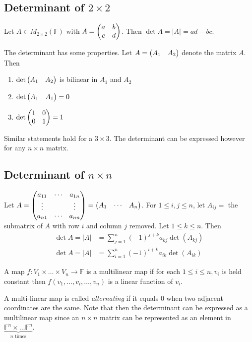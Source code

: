 \documentclass[../notes.tex]{subfiles}
\begin{document}

\subsection{Determinant of $2 \times 2$}

\begin{definition}
    Let $A \in M_{2\times 2}(\mathbb{F})$ with $A = \mqty(a & b \\ c & d)$. Then $\det A = |A| = ad - bc$.
    \begin{remark}
        The determinant has some properties. Let $A = \mqty(A_1 & A_2)$ denote the matrix $A$. Then
        \begin{enumerate}
            \item $\det\mqty(A_1 & A_2)$ is bilinear in $A_1$ and $A_2$
            \item $\det\mqty(A_1 & A_1) = 0$
            \item $\det\mqty(1 & 0 \\ 0 & 1) = 1$
        \end{enumerate}
    \end{remark}
\end{definition}

Similar statements hold for a $3\times 3$. The determinant can be expressed however for any $n \times n$ matrix.

\subsection{Determinant of $n \times n$}

\begin{definition}[Determinant]
    Let $A = \mqty(a_{11} & \cdots & a_{1n} \\ \vdots & & \vdots \\ a_{n1} & \cdots & a_{nn}) = \mqty(A_1 & \cdots & A_n)$. For $1 \leq i,j \leq n$, let $A_{ij} = $ the submatrix of $A$ with row $i$ and column $j$ removed. Let $1 \leq k \leq n$. Then
    \begin{align*}
        \det A = |A| &= \sum_{j = 1}^n (-1)^{j+k} a_{kj} \det(A_{kj}) \tag{Row Expansion} \\
        \det A = |A| &= \sum_{i = 1}^n (-1)^{i+k} a_{ik} \det(A_{ik}) \tag{Column Expansion}
    \end{align*}
\end{definition}

\begin{definition}
    A map $f : V_1 \times \ldots \times V_n \to \mathbb{F}$ is a multilinear map if for each $1 \leq i \leq n, v_i$ is held constant then $f(v_1, \ldots, v_i, \ldots, v_n)$ is a linear function of $v_i$.
\end{definition}
A multi-linear map is called \textit{alternating} if it equals $0$ when two adjacent coordinates are the same. Note that then the determinant can be expressed as a multilinear map since an $n\times n$ matrix can be represented as an element in $\underbrace{\mathbb{F}^n \times \ldots \mathbb{F}^n}_{n \text{ times}}$.  
\end{document}
